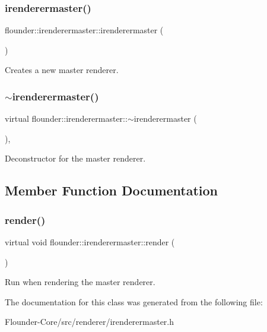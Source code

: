 \subsubsection{\texorpdfstring{irenderermaster()}{irenderermaster()}}
{\footnotesize\ttfamily flounder\+::irenderermaster\+::irenderermaster (\begin{DoxyParamCaption}{ }\end{DoxyParamCaption})\hspace{0.3cm}{\ttfamily [inline]}}



Creates a new master renderer. 

\mbox{\label{classflounder_1_1irenderermaster_a4e83c1d1dafc479ea14392edcd131c73}} 
\subsubsection{\texorpdfstring{$\sim$irenderermaster()}{~irenderermaster()}}
{\footnotesize\ttfamily virtual flounder\+::irenderermaster\+::$\sim$irenderermaster (\begin{DoxyParamCaption}{ }\end{DoxyParamCaption})\hspace{0.3cm}{\ttfamily [inline]}, {\ttfamily [virtual]}}



Deconstructor for the master renderer. 



\subsection{Member Function Documentation}
\mbox{\label{classflounder_1_1irenderermaster_ae5719349eb4b111889156f9560d9c3e0}} 
\subsubsection{\texorpdfstring{render()}{render()}}
{\footnotesize\ttfamily virtual void flounder\+::irenderermaster\+::render (\begin{DoxyParamCaption}{ }\end{DoxyParamCaption})\hspace{0.3cm}{\ttfamily [pure virtual]}}



Run when rendering the master renderer. 



The documentation for this class was generated from the following file\+:\begin{DoxyCompactItemize}
\item 
Flounder-\/\+Core/src/renderer/irenderermaster.\+h\end{DoxyCompactItemize}
